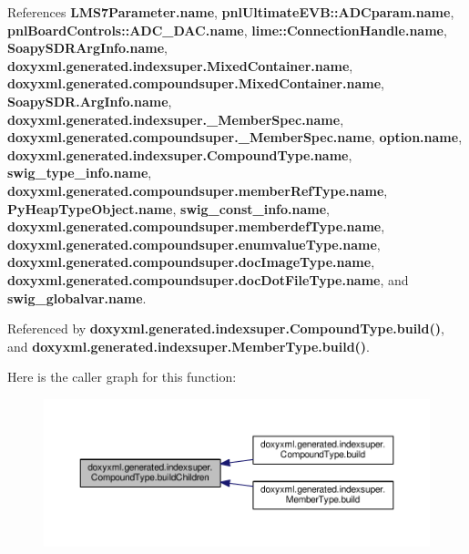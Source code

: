 References {\bf L\+M\+S7\+Parameter.\+name}, {\bf pnl\+Ultimate\+E\+V\+B\+::\+A\+D\+Cparam.\+name}, {\bf pnl\+Board\+Controls\+::\+A\+D\+C\+\_\+\+D\+A\+C.\+name}, {\bf lime\+::\+Connection\+Handle.\+name}, {\bf Soapy\+S\+D\+R\+Arg\+Info.\+name}, {\bf doxyxml.\+generated.\+indexsuper.\+Mixed\+Container.\+name}, {\bf doxyxml.\+generated.\+compoundsuper.\+Mixed\+Container.\+name}, {\bf Soapy\+S\+D\+R.\+Arg\+Info.\+name}, {\bf doxyxml.\+generated.\+indexsuper.\+\_\+\+Member\+Spec.\+name}, {\bf doxyxml.\+generated.\+compoundsuper.\+\_\+\+Member\+Spec.\+name}, {\bf option.\+name}, {\bf doxyxml.\+generated.\+indexsuper.\+Compound\+Type.\+name}, {\bf swig\+\_\+type\+\_\+info.\+name}, {\bf doxyxml.\+generated.\+compoundsuper.\+member\+Ref\+Type.\+name}, {\bf Py\+Heap\+Type\+Object.\+name}, {\bf swig\+\_\+const\+\_\+info.\+name}, {\bf doxyxml.\+generated.\+compoundsuper.\+memberdef\+Type.\+name}, {\bf doxyxml.\+generated.\+compoundsuper.\+enumvalue\+Type.\+name}, {\bf doxyxml.\+generated.\+compoundsuper.\+doc\+Image\+Type.\+name}, {\bf doxyxml.\+generated.\+compoundsuper.\+doc\+Dot\+File\+Type.\+name}, and {\bf swig\+\_\+globalvar.\+name}.



Referenced by {\bf doxyxml.\+generated.\+indexsuper.\+Compound\+Type.\+build()}, and {\bf doxyxml.\+generated.\+indexsuper.\+Member\+Type.\+build()}.



Here is the caller graph for this function\+:
\nopagebreak
\begin{figure}[H]
\begin{center}
\leavevmode
\includegraphics[width=350pt]{d6/db9/classdoxyxml_1_1generated_1_1indexsuper_1_1CompoundType_aecfe7f49bba809b1e90e15d986c46790_icgraph}
\end{center}
\end{figure}


